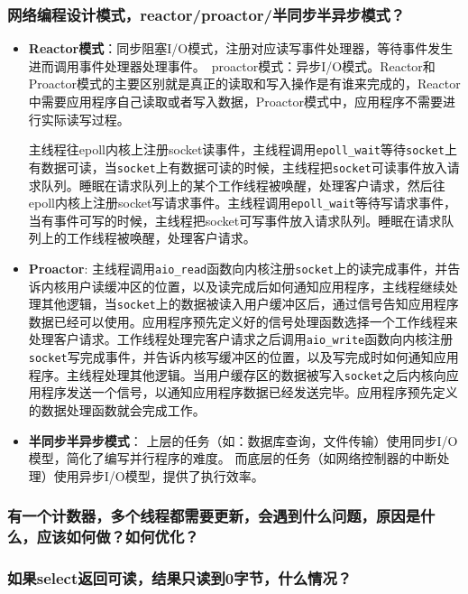 \documentclass[UTF8,a4paper,8pt]{ctexart}
\begin{document}
		\subsubsection{网络编程设计模式，reactor/proactor/半同步半异步模式？}
			\begin{itemize}
				\item \textbf{Reactor模式}：同步阻塞I/O模式，注册对应读写事件处理器，等待事件发生进而调用事件处理器处理事件。 proactor模式：异步I/O模式。Reactor和Proactor模式的主要区别就是真正的读取和写入操作是有谁来完成的，Reactor中需要应用程序自己读取或者写入数据，Proactor模式中，应用程序不需要进行实际读写过程。
				
				主线程往epoll内核上注册socket读事件，主线程调用\verb|epoll_wait|等待\verb|socket|上有数据可读，当\verb|socket|上有数据可读的时候，主线程把\verb|socket|可读事件放入请求队列。睡眠在请求队列上的某个工作线程被唤醒，处理客户请求，然后往epoll内核上注册socket写请求事件。主线程调用\verb|epoll_wait|等待写请求事件，当有事件可写的时候，主线程把socket可写事件放入请求队列。睡眠在请求队列上的工作线程被唤醒，处理客户请求。
				\item \textbf{Proactor}:
				主线程调用\verb|aio_read|函数向内核注册\verb|socket|上的读完成事件，并告诉内核用户读缓冲区的位置，以及读完成后如何通知应用程序，主线程继续处理其他逻辑，当\verb|socket|上的数据被读入用户缓冲区后，通过信号告知应用程序数据已经可以使用。应用程序预先定义好的信号处理函数选择一个工作线程来处理客户请求。工作线程处理完客户请求之后调用\verb|aio_write|函数向内核注册\verb|socket|写完成事件，并告诉内核写缓冲区的位置，以及写完成时如何通知应用程序。主线程处理其他逻辑。当用户缓存区的数据被写入\verb|socket|之后内核向应用程序发送一个信号，以通知应用程序数据已经发送完毕。应用程序预先定义的数据处理函数就会完成工作。
				
				\item \textbf{半同步半异步模式}：
				上层的任务（如：数据库查询，文件传输）使用同步I/O模型，简化了编写并行程序的难度。
				而底层的任务（如网络控制器的中断处理）使用异步I/O模型，提供了执行效率。
			\end{itemize}
			
	
			
		\subsubsection{有一个计数器，多个线程都需要更新，会遇到什么问题，原因是什么，应该如何做？如何优化？}
		
		\subsubsection{如果select返回可读，结果只读到0字节，什么情况？}
		
\end{document}
